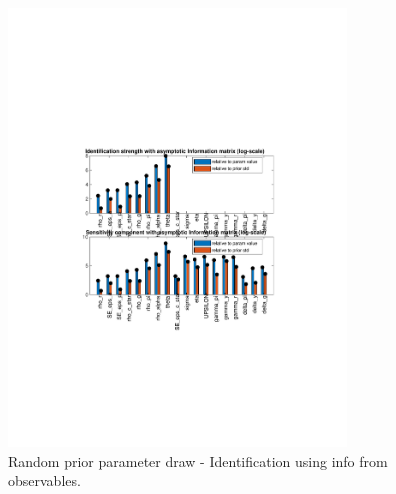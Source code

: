 
\begin{figure}[H]
\centering 
\includegraphics[width=0.8\textwidth]{fiscal/identification/fiscal_ident_strength_Random_prior_params}
\caption{Random prior parameter draw  - Identification using info from observables.}\label{Fig:ident:Random_prior_params}
\end{figure}

